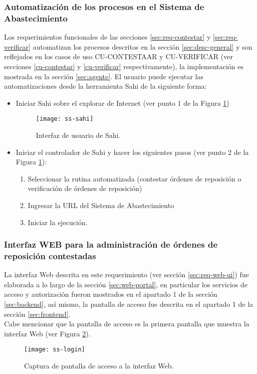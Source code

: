 \subsubsection{Automatización de los procesos en el Sistema de Abastecimiento}
Los requerimientos funcionales de las secciones \ref{sec:req-contestar} y \ref{sec:req-verificar} automatizan los procesos descritos en la sección \ref{sec:desc-general} y son reflejados en los casos de uso CU-CONTESTAAR y CU-VERIFICAR (ver secciones \ref{cu-contestar} y \ref{cu-verificar} respectivamente), la implementación es mostrada en la sección \ref{sec:agente}. El usuario puede ejecutar las automatizaciones desde la herramienta Sahi de la siguiente forma:
\begin{itemize}
	\item Iniciar Sahi sobre el explorar de Internet (ver punto 1 de la Figura \ref{fig:ss-sahi})
	\begin{figure}[h]
		\centering
		\texttt{[image: ss-sahi]}
		\caption{Interfaz de usuario de Sahi.}
		\label{fig:ss-sahi}
	\end{figure}

	\item Iniciar el controlador de Sahi y hacer los siguientes pasos (ver punto 2 de la Figura \ref{fig:ss-sahi}):
	\begin{enumerate}
		\item Seleccionar la rutina automatizada (contestar órdenes de reposición o verificación de órdenes de reposición)
		\item Ingresar la URL del Sistema de Abastecimiento
		\item Iniciar la ejecución.
	\end{enumerate}
\end{itemize}

\subsubsection{Interfaz WEB para la administración de órdenes de reposición contestadas}
La interfaz Web descrita en este requerimiento (ver sección \ref{sec:req-web-ui}) fue elaborada a lo largo de la sección \ref{sec:web-portal}, en particular los servicios de acceso y autorización fueron mostrados en el apartado 1 de la sección \ref{sec:backend}, así mismo, la pantalla de acceso fue descrita en el apartado 1 de la sección \ref{sec:frontend}.\\
Cabe mencionar que la pantalla de acceso es la primera pantalla que muestra la interfaz Web (ver Figura \ref{fig:ss-login}).
\begin{figure}[h]
	\centering
	\texttt{[image: ss-login]}
	\caption{Captura de pantalla de acceso a la interfaz Web.}
	\label{fig:ss-login}
\end{figure}

